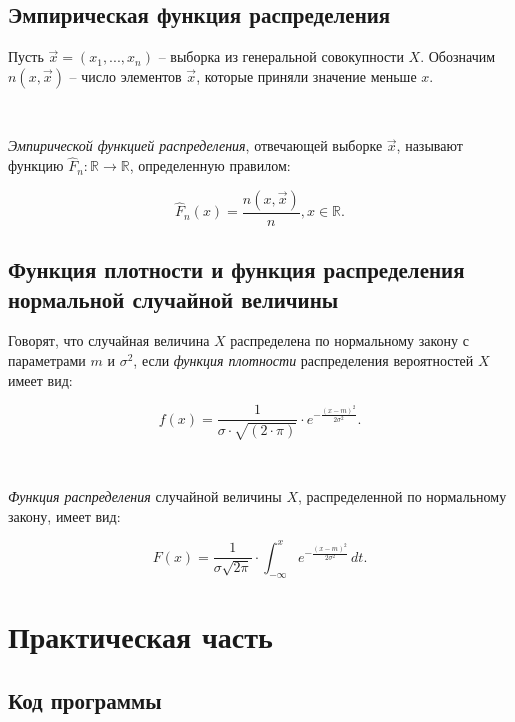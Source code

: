 \section{Эмпирическая функция распределения}

Пусть $\vec x = (x_1, ..., x_n)$ -- выборка из генеральной совокупности $X$. Обозначим $n(x, \vec x)$ -- число элементов $\vec x$, которые приняли значение меньше $x$.

~\

\textit{Эмпирической функцией распределения}, отвечающей выборке $\vec{x}$, называют функцию $\hat{F}_n: \mathbb{R} \to \mathbb{R}$, определенную правилом: 

\begin{equation*}
 \hat{F}_n(x) = \frac{n(x, \vec x)}{n}, x \in \mathbb{R}.
\end{equation*}

\section{Функция плотности и функция распределения нормальной случайной величины}

Говорят, что случайная величина $X$ распределена по нормальному закону с параметрами $m$ и $\sigma^2$, если \textit{функция плотности} распределения вероятностей $X$ имеет вид:

\begin{equation*}
 f(x) = \frac{1}{\sigma \cdot \sqrt{(2 \cdot \pi)}} \cdot e^{-\frac{(x - m)^2}{2\sigma^2}}.
\end{equation*}

~\

\textit{Функция распределения} случайной величины $X$, распределенной по нормальному закону, имеет вид:

\begin{equation*}
 F(x) = \frac{1}{\sigma \sqrt{2 \pi}} \cdot \int_{-\infty}^{x}e^{-\frac{(x - m)^2}{2\sigma^2}}\, dt.
\end{equation*}

\chapter{Практическая часть}

\section{Код программы}

